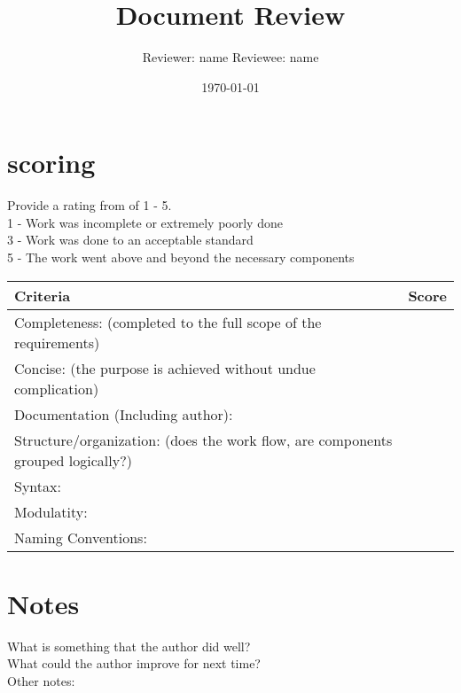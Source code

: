\documentclass{article}
\title{Document Review}
\author{Reviewer: name Reviewee: name }
\date{\today}
\begin{document}
\maketitle

\section{scoring}
    Provide a rating from of 1 - 5. \\
    1 - Work was incomplete or extremely poorly done\\
    3 - Work was done to an acceptable standard\\
    5 - The work went above and beyond the necessary components\\

\begin{tabular}{|l|c|}
	\hline
	Criteria & Score\\
	\hline
    Completeness:
    (completed to the full scope of the requirements) & \\
	\hline
    Concise:
    (the purpose is achieved without undue complication) & \\
	\hline
    Documentation (Including author): & \\
    \hline
    Structure/organization:
    (does the work flow, are components grouped logically?) & \\
    \hline
    Syntax: & \\
    \hline
    Modulatity: & \\
    \hline
    Naming Conventions: & \\
    \hline
\end{tabular}

\section{Notes}
    
    What is something that the author did well?\\
    
    What could the author improve for next time?\\
    
    Other notes:\\
\end{document}
